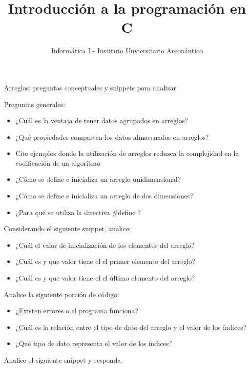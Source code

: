 \documentclass[xcolor=pdftex,table,11pt]{beamer}
\author{Informática I - Instituto Unviersitario Areonáutico}
\title{Introducción a la programación en C}
\begin{document}
\begin{frame}[allowframebreaks]{Arreglos: preguntas conceptuales y snippets para analizar}


Preguntas generales:


\begin{itemize}
\item ¿Cuál es la ventaja de tener datos agrupados en arreglos?
\item ¿Qué propiedades comparten los datos almacenados en arreglos?
\item Cite ejemplos donde la utilización de arreglos reduzca la complejidad en la codificación de un algoritmo
\item ¿Cómo se define e inicializa un arreglo unidimensional?
\item ¿Cómo se define e inicializa un arreglo de dos dimensiones?
\item ¿Para qué se utiliza la directiva \#define ?
\end{itemize}
\newpage


Considerando el siguiente snippet, analice:
\codesetstylefrombeamer
{}


\begin{itemize}

\item ¿Cuál el valor de inicialización de los elementos del arreglo?
\item ¿Cuál es y que valor tiene el el primer elemento del arreglo?
\item ¿Cuál es y que valor tiene el el último elemento del arreglo?

\end{itemize}

\newpage
Analice la siguiente porción de código:

\codesetstylefrombeamer
{}


\begin{itemize}

\item ¿Existen errores o el programa funciona?
\item ¿Cuál es la relación entre el tipo de dato del arreglo y el valor de los índices?
\item ¿Qué tipo de dato representa el valor de los índices?

\end{itemize}


\newpage

Analice el siguiente snippet y responda:


\end{frame}
\end{document}
